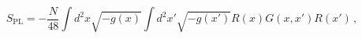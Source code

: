 \begin{equation}
S_{\text{PL}} = -\frac{N}{48} \int d^2x \sqrt{-g(x)} \int d^2x'
\sqrt{-g(x')} R(x) G(x,x')  R(x')\, ,
\end{equation}


